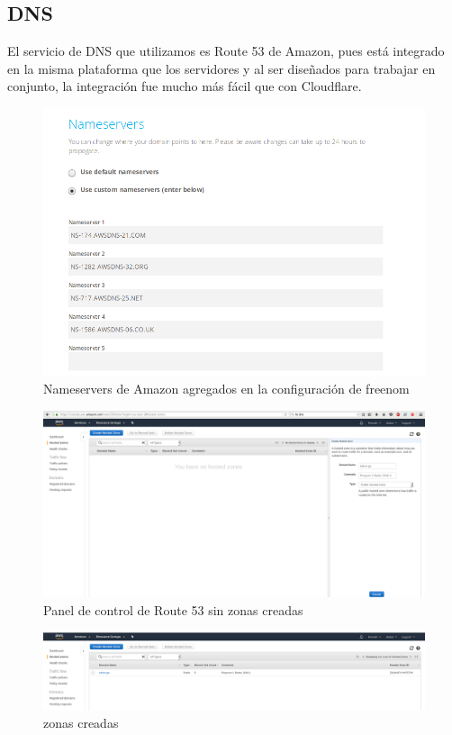 \documentclass[12pt]{article}
\begin{document}
\subsection{DNS}
El servicio de \textsf{DNS} que utilizamos es \textsf{Route 53} de Amazon, pues está integrado en la misma plataforma que los servidores y al ser diseñados para trabajar en conjunto, la integración fue mucho más fácil que con Cloudflare.
\begin{figure}[H]
  \centering
  \includegraphics[width=0.8\linewidth]{nameservers}
  \caption{Nameservers de Amazon agregados en la configuración de freenom}
\end{figure}
\begin{figure}[H]
  \centering
  \includegraphics[width=0.8\linewidth]{DNS_management}
  \caption{Panel de control de Route 53 sin zonas creadas}
\end{figure}
\begin{figure}[H]
  \centering
  \includegraphics[width=0.8\linewidth]{HostedZones}
  \caption{zonas creadas}
\end{figure}
\end{document}
